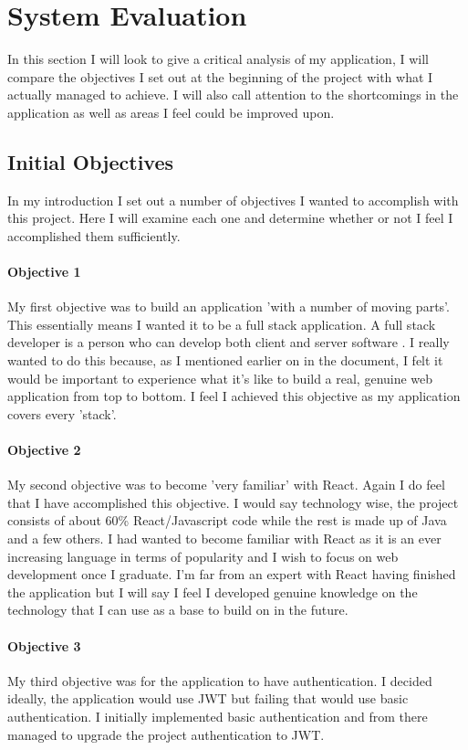 \chapter{System Evaluation}
In this section I will look to give a critical analysis of my application, I will compare the objectives I set out at the beginning of the project with what I actually managed to achieve. I will also call attention to the shortcomings in the application as well as areas I feel could be improved upon.


\section{Initial Objectives}
In my introduction I set out a number of objectives I wanted to accomplish with this project. Here I will examine each one and determine whether or not I feel I accomplished them sufficiently.

\subsubsection{Objective 1}
My first objective was to build an application 'with a number of moving parts'. This essentially means I wanted it to be a full stack application. A full stack developer is a person who can develop both client and server software \cite{FullStack}. I really wanted to do this because, as I mentioned earlier on in the document, I felt it would be important to experience what it's like to build a real, genuine web application from top to bottom. I feel I achieved this objective as my application covers every 'stack'.

\subsubsection{Objective 2}
My second objective was to become 'very familiar' with React. Again I do feel that I have accomplished this objective. I would say technology wise, the project consists of about 60\% React/Javascript code while the rest is made up of Java and a few others. I had wanted to become familiar with React as it is an ever increasing language in terms of popularity and I wish to focus on web development once I graduate. I'm far from an expert with React having finished the application but I will say I feel I developed genuine knowledge on the technology that I can use as a base to build on in the future.

\subsubsection{Objective 3}
My third objective was for the application to have authentication. I decided ideally, the application would use JWT but failing that would use basic authentication. I initially implemented basic authentication and from there managed to upgrade the project authentication to JWT.


